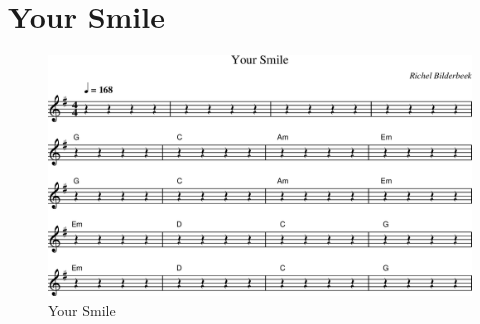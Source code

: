\chapter{Your Smile}

%

\begin{figure}[!htbp]
  \includegraphics[width=\textwidth,height=\textheight,keepaspectratio]{../songs/xx_your_smile.png}
  \caption{Your Smile}
  \label{fig:xx_your_smile}
\end{figure}
